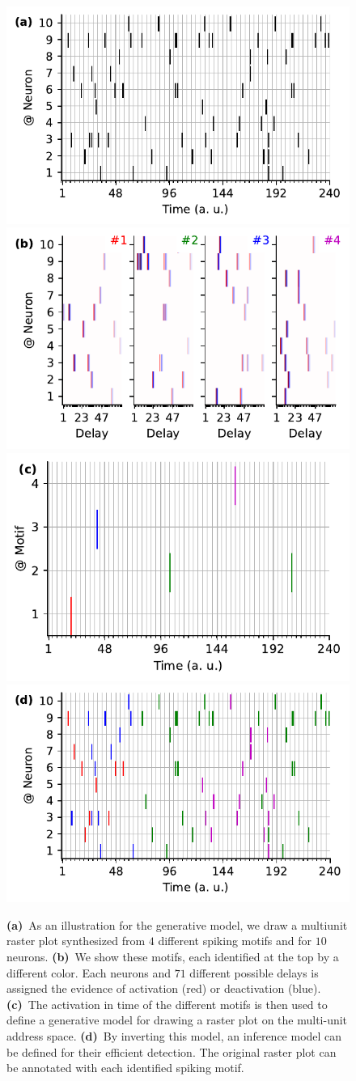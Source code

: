 \documentclass[runningheads]{llncs}
\begin{document}
\begin{figure}[t]%
    \includegraphics[width=.50\linewidth]{figures/THC_1a_k.pdf}
    \includegraphics[width=.46\linewidth]{figures/THC_1b.pdf}\\
  \includegraphics[width=.50\linewidth]{figures/THC_1c.pdf}
    \includegraphics[width=.50\linewidth]{figures/THC_1a.pdf}
  
\caption{\textbf{(a)}~As an illustration for the generative model, we draw a multiunit raster plot synthesized from $4$ different spiking motifs and for $10$ neurons. \textbf{(b)}~We show these motifs, each identified at the top by a different color. Each neurons and $71$ different possible delays is assigned the evidence of activation (red) or deactivation (blue). \textbf{(c)}~The activation in time of the different motifs is then used to define a generative model for drawing a raster plot on the multi-unit address space. \textbf{(d)}~By inverting this model, an inference model can be defined for their efficient detection. The original raster plot can be annotated with each identified spiking motif.
}
\label{fig:THC}
\end{figure}
\end{document}
